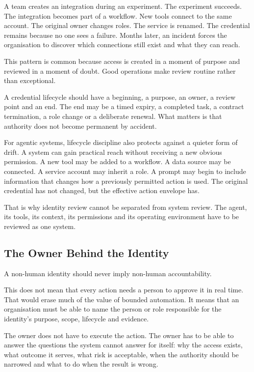 A team creates an integration during an experiment. The experiment
succeeds. The integration becomes part of a workflow. New tools connect
to the same account. The original owner changes roles. The service is
renamed. The credential remains because no one sees a failure. Months
later, an incident forces the organisation to discover which connections
still exist and what they can reach.

This pattern is common because access is created in a moment of purpose
and reviewed in a moment of doubt. Good operations make review routine
rather than exceptional.

A credential lifecycle should have a beginning, a purpose, an owner, a
review point and an end. The end may be a timed expiry, a completed
task, a contract termination, a role change or a deliberate renewal.
What matters is that authority does not become permanent by accident.

For agentic systems, lifecycle discipline also protects against a
quieter form of drift. A system can gain practical reach without
receiving a new obvious permission. A new tool may be added to a
workflow. A data source may be connected. A service account may inherit
a role. A prompt may begin to include information that changes how a
previously permitted action is used. The original credential has not
changed, but the effective action envelope has.

That is why identity review cannot be separated from system review. The
agent, its tools, its context, its permissions and its operating
environment have to be reviewed as one system.

\subsection{The Owner Behind the
Identity}\label{the-owner-behind-the-identity}

A non-human identity should never imply non-human accountability.

This does not mean that every action needs a person to approve it in
real time. That would erase much of the value of bounded automation. It
means that an organisation must be able to name the person or role
responsible for the identity's purpose, scope, lifecycle and evidence.

The owner does not have to execute the action. The owner has to be able
to answer the questions the system cannot answer for itself: why the
access exists, what outcome it serves, what risk is acceptable, when the
authority should be narrowed and what to do when the result is wrong.

